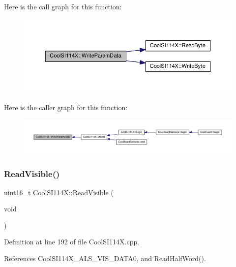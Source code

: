 Here is the call graph for this function\+:
\nopagebreak
\begin{figure}[H]
\begin{center}
\leavevmode
\includegraphics[width=350pt]{dd/d67/class_cool_s_i114_x_abf45eb10a6de1be16e68a51624fa2608_cgraph}
\end{center}
\end{figure}
Here is the caller graph for this function\+:
\nopagebreak
\begin{figure}[H]
\begin{center}
\leavevmode
\includegraphics[width=350pt]{dd/d67/class_cool_s_i114_x_abf45eb10a6de1be16e68a51624fa2608_icgraph}
\end{center}
\end{figure}
\mbox{\label{class_cool_s_i114_x_a42e0e574256341443c647a4c0eda87d5}} 
\subsubsection{\texorpdfstring{Read\+Visible()}{ReadVisible()}}
{\footnotesize\ttfamily uint16\+\_\+t Cool\+S\+I114\+X\+::\+Read\+Visible (\begin{DoxyParamCaption}\item[{void}]{ }\end{DoxyParamCaption})}



Definition at line 192 of file Cool\+S\+I114\+X.\+cpp.



References Cool\+S\+I114\+X\+\_\+\+A\+L\+S\+\_\+\+V\+I\+S\+\_\+\+D\+A\+T\+A0, and Read\+Half\+Word().



